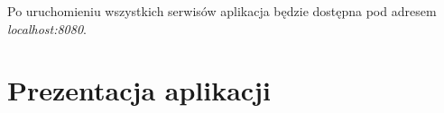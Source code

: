 Po uruchomieniu wszystkich serwisów aplikacja będzie dostępna pod adresem \textit{localhost:8080}.

\section{Prezentacja aplikacji}\label{sec:app-presentation}

\thispagestyle{normal}
